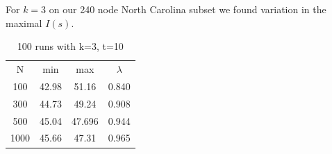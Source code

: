 \documentclass{article}
\begin{document}
		For $k = 3$ on our 240 node North Carolina subset we found variation in the maximal $I(s)$.

		\begin{table}[h!]
		  \begin{center}
		    \caption{100 runs with k=3, t=10}
		    \label{tab:table1}
		    \begin{tabular}{|c|c|c|c|} 
		      \hline
		      N & min & max & $\lambda$\\
		      100  & 42.98 & 51.16 & 0.840\\
		      300  & 44.73 & 49.24 & 0.908\\
		      500  & 45.04 & 47.696 & 0.944\\
		      1000 & 45.66 & 47.31 & 0.965\\
		      \hline
		    \end{tabular}
		  \end{center}
		\end{table}
\end{document}
